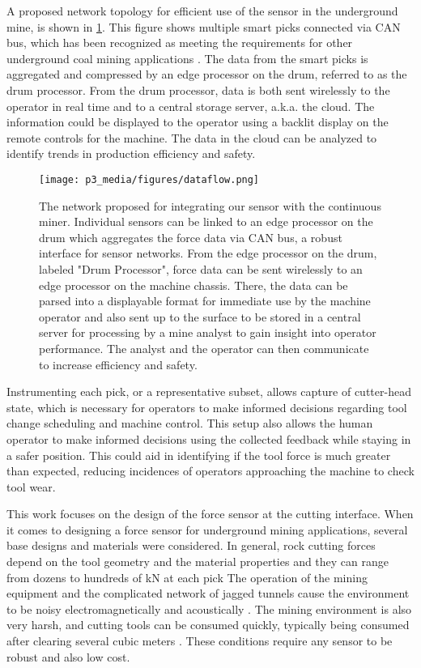 A proposed network topology for efficient use of the sensor
in the underground mine, is shown in \ref{fig:network_proposal}. 
This figure shows multiple smart picks 
connected via CAN bus, which has been recognized as meeting the requirements for 
other underground coal mining applications \cite{Shu2010, Ma2021}. 
The data from the smart picks is aggregated and compressed by an edge processor on the drum,
 referred to as the drum processor.
From the drum processor, data is both sent wirelessly to the 
operator in real time and to a central storage server, a.k.a. the cloud. 
The information could be displayed to the operator using a backlit display 
on the remote controls for the machine.
The data in the cloud can be analyzed to identify trends in production efficiency and safety. 

\begin{figure}[t]
\centering
\texttt{[image: p3\_media/figures/dataflow.png]}
\caption{The network proposed for integrating our sensor with the continuous miner.
Individual sensors can be linked to an edge processor on the drum which aggregates the force data via CAN bus,
a robust interface for sensor networks. From the edge processor on the drum, labeled "Drum Processor",
force data can be sent wirelessly to an edge processor on the machine chassis. 
There, the data can be parsed into a displayable format for
immediate use by the machine operator and also sent up to the surface to be stored in a central server for 
processing by a mine analyst to gain insight into operator performance. 
The analyst and the operator can then communicate to increase efficiency and safety.}
\label{fig:network_proposal}
\end{figure}

Instrumenting each pick, or a representative subset, allows capture of cutter-head state,
which is necessary for operators to make informed decisions 
regarding tool change scheduling and machine control. 
This setup also allows the human operator to make informed decisions using the collected feedback
while staying in a safer position. 
This could aid in identifying if the tool force is much greater than expected,
reducing incidences of operators approaching the machine to check tool wear.

This work focuses on the design of the force sensor at the cutting interface.
When it comes to designing a force sensor for underground mining applications, 
several base designs and materials were considered. 
In general, rock cutting forces depend on the tool geometry and the material properties and
they can range from dozens to hundreds of kN at each pick \cite{Zeng2021, Fan2023, Roxborough1981, Bilgin2006}
The operation of the mining equipment and the complicated network of jagged tunnels cause the 
environment to be noisy electromagnetically and acoustically
\cite{Ikeda2021, Seguel2022, Yarkan2009, Thrybom2015, Ranjan2014}. 
The mining environment is also very harsh, and cutting tools can be consumed quickly, 
typically being consumed after clearing several cubic meters \cite{Hurt1985, Su2020, Rostami2003}.
These conditions require any sensor to be robust and also low cost.

